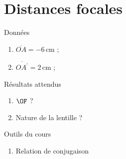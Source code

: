 \documentclass[10pt,notitlepage]{book}
\begin{document}
\section{Distances focales}
\begin{NCdefi}{Données}
	\begin{enumerate}
		\item $\overline{OA} = -6\,$cm ;
		\item $\overline{OA^\prime} = 2\,$cm ;
	\end{enumerate}
\end{NCdefi}

\begin{NCprop}{Résultats attendus}
	\begin{enumerate}
		\item $\OF$ ?
		\item Nature de la lentille ?
	\end{enumerate}
\end{NCprop}

\begin{NCdemo}{Outils du cours}
	\begin{enumerate}
		\item Relation de conjugaison
	\end{enumerate} 
\end{NCdemo}
\end{document}
